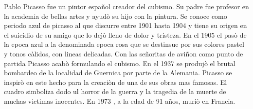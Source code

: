 Pablo Picasso fue un pintor español creador del cubismo. Su padre fue profesor en la academia de bellas artes y ayudò su hijo con la pintura.
Se conoce como periodo azul de picasso al que discurre entre 1901 hasta 1904 y tiene su origen en el suicidio de su amigo que lo dejò lleno de dolor y tristeza.
En el 1905 el pasò de la epoca azul a la denominada epoca rosa que se destinsue por sus colores pastel y tonos càlidos, con lineas delicadas.
Con las señoritas de aviñon como punto de partida Picasso acabò formulando el cubismo.
En el 1937 se produjò el brutal bombardeo de la localidad de Guernica por parte de la Alemania.
Picasso se inspirò en este hecho para la creaciòn de una de sus obras mas famosas.
El cuadro simboliza dodo ul horror de la guerra y la tragedia de la muerte de muchas victimas inocentes.
En 1973 , a la edad de 91 años, muriò en Francia.
